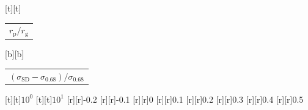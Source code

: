 %    
%
%
\begin{psfrags}%
\psfragscanon%
%
[t][t]{\color[rgb]{0,0,0}\setlength{\tabcolsep}{0pt}\begin{tabular}{c}{\Large$r_\mathrm{p}/r_\mathrm{g}$}\end{tabular}}%
[b][b]{\color[rgb]{0,0,0}\setlength{\tabcolsep}{0pt}\begin{tabular}{c}{\Large$(\sigma_\mathrm{SD}-\sigma_{0.68})/\sigma_{0.68}$}\end{tabular}}%
%
[t][t]{$10^{0}$}%
[t][t]{$10^{1}$}%
%
[r][r]{-0.2}%
[r][r]{-0.1}%
[r][r]{0}%
[r][r]{0.1}%
[r][r]{0.2}%
[r][r]{0.3}%
[r][r]{0.4}%
[r][r]{0.5}%
%
%
\end{psfrags}%
%
